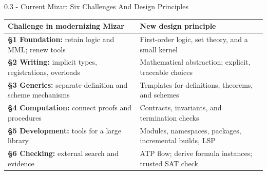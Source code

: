 \documentclass[aspectratio=169,11pt]{beamer}
\begin{document}
\begin{frame}[fragile,t]{0.3 - Current Mizar: Six Challenges And Design Principles}
\begin{footnotesize}
\setlength{\tabcolsep}{3pt}
\renewcommand{\arraystretch}{1.15}
\begin{tabularx}{\textwidth}{>{\raggedright\arraybackslash}X>{\raggedright\arraybackslash}X}
\toprule
\textbf{Challenge in modernizing Mizar} & \textbf{New design principle} \\
\midrule
\textcolor{blue!55!black}{\textbf{§1 Foundation:}} retain logic and MML; renew tools & First-order logic, set theory, and a small kernel \\
\textcolor{blue!55!black}{\textbf{§2 Writing:}} implicit types, registrations, overloads & Mathematical abstraction; explicit, traceable choices \\
\textcolor{blue!55!black}{\textbf{§3 Generics:}} separate definition and scheme mechanisms & Templates for definitions, theorems, and schemes \\
\textcolor{blue!55!black}{\textbf{§4 Computation:}} connect proofs and procedures & Contracts, invariants, and termination checks \\
\textcolor{blue!55!black}{\textbf{§5 Development:}} tools for a large library & Modules, namespaces, packages, incremental builds, LSP \\
\textcolor{blue!55!black}{\textbf{§6 Checking:}} external search and evidence & ATP flow; derive formula instances; trusted SAT check \\
\bottomrule
\end{tabularx}
\end{footnotesize}

\end{frame}
\end{document}
